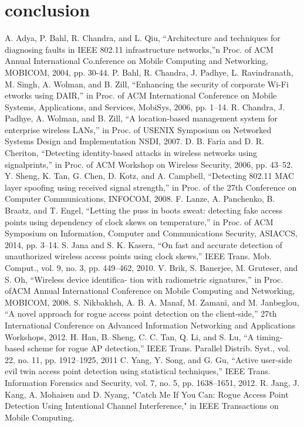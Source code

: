 \documentclass[conference]{IEEEtran}
\begin{document}
\section{conclusion}\label{sec:6}
\begin{thebibliography}{00}
 A. Adya, P. Bahl, R. Chandra, and L. Qiu, “Architecture and techniques for diagnosing faults in IEEE 802.11 infrastructure networks,”n Proc. of ACM Annual International Co.nference on Mobile Computing and Networking, MOBICOM, 2004, pp. 30-44.
 P. Bahl, R. Chandra, J. Padhye, L. Ravindranath, M. Singh, A. Wolman, and B. Zill, “Enhancing the security of corporate Wi-Fi etworks using DAIR,” in Proc. of ACM International Conference on Mobile Systems, Applications, and Services, MobiSys, 2006, pp. 1–14.
 R. Chandra, J. Padhye, A. Wolman, and B. Zill, “A location-based management system for enterprise wireless LANs,” in Proc. of USENIX Symposium on Networked Systems Design and Implementation NSDI, 2007.
 D. B. Faria and D. R. Cheriton, “Detecting identity-based attacks in wireless networks using signalprints,” in Proc. of ACM Workshop on Wireless Security, 2006, pp. 43–52.
 Y. Sheng, K. Tan, G. Chen, D. Kotz, and A. Campbell, “Detecting 802.11 MAC layer spoofing using received signal strength,” in Proc. of the 27th Conference on Computer Communications, INFOCOM, 2008.
 F. Lanze, A. Panchenko, B. Braatz, and T. Engel, “Letting the puss in boots sweat: detecting fake access points using dependency of clock skews on temperature,” in Proc. of ACM Symposium on Information, Computer and Communications Security, ASIACCS, 2014, pp. 3–14.
 S. Jana and S. K. Kasera, “On fast and accurate detection of unauthorized wireless access points using clock skews,” IEEE Trans. Mob. Comput., vol. 9, no. 3, pp. 449–462, 2010.
 V. Brik, S. Banerjee, M. Gruteser, and S. Oh, “Wireless device identifica- tion with radiometric signatures,” in Proc. ofACM Annual International Conference on Mobile Computing and Networking, MOBICOM, 2008.
 S. Nikbakhsh, A. B. A. Manaf, M. Zamani, and M. Janbeglou, “A novel approach for rogue access point detection on the client-side,” 27th International Conference on Advanced Information Networking and Applications Workshops, 2012.
 H. Han, B. Sheng, C. C. Tan, Q. Li, and S. Lu, “A timing-based scheme for rogue AP detection,” IEEE Trans. Parallel Distrib. Syst., vol. 22, no. 11, pp. 1912–1925, 2011
 C. Yang, Y. Song, and G. Gu, “Active user-side evil twin access point detection using statistical techniques,” IEEE Trans. Information Forensics and Security, vol. 7, no. 5, pp. 1638–1651, 2012.
 R. Jang, J. Kang, A. Mohaisen and D. Nyang, "Catch Me If You Can: Rogue Access Point Detection Using Intentional Channel Interference," in IEEE Transactions on Mobile Computing.

\end{thebibliography}
\vspace{12pt}
\end{document}
